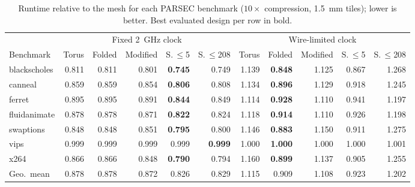 \begin{table}[t]
\centering
\caption{Runtime relative to the mesh for each PARSEC benchmark ($10\times$ compression, 1.5~mm tiles); lower is better. Best evaluated design per row in bold.}
\label{tab:perbench}
\small
\begin{tabular}{@{}lrrrrrrrrrr@{}}
\toprule
 & \multicolumn{5}{c}{Fixed 2~GHz clock} & \multicolumn{5}{c}{Wire-limited clock} \\
\cmidrule(lr){2-6}\cmidrule(l){7-11}
Benchmark & Torus & Folded & Modified & S.\,$\le$5 & S.\,$\le$208 & Torus & Folded & Modified & S.\,$\le$5 & S.\,$\le$208 \\
\midrule
blackscholes & 0.811 & 0.811 & 0.801 & \textbf{0.745} & 0.749 & 1.139 & \textbf{0.848} & 1.125 & 0.867 & 1.268 \\
canneal & 0.859 & 0.859 & 0.854 & \textbf{0.806} & 0.808 & 1.134 & \textbf{0.896} & 1.129 & 0.918 & 1.245 \\
ferret & 0.895 & 0.895 & 0.891 & \textbf{0.844} & 0.849 & 1.114 & \textbf{0.928} & 1.110 & 0.941 & 1.197 \\
fluidanimate & 0.878 & 0.878 & 0.871 & \textbf{0.822} & 0.824 & 1.118 & \textbf{0.914} & 1.110 & 0.926 & 1.198 \\
swaptions & 0.848 & 0.848 & 0.851 & \textbf{0.795} & 0.800 & 1.146 & \textbf{0.883} & 1.150 & 0.911 & 1.275 \\
vips & 0.999 & 0.999 & 0.999 & 0.999 & \textbf{0.999} & 1.000 & \textbf{1.000} & 1.000 & 1.000 & 1.001 \\
x264 & 0.866 & 0.866 & 0.848 & \textbf{0.790} & 0.794 & 1.160 & \textbf{0.899} & 1.137 & 0.905 & 1.255 \\
\midrule
Geo.\ mean & 0.878 & 0.878 & 0.872 & 0.826 & 0.829 & 1.115 & 0.909 & 1.108 & 0.923 & 1.202 \\
\bottomrule
\end{tabular}
\end{table}
